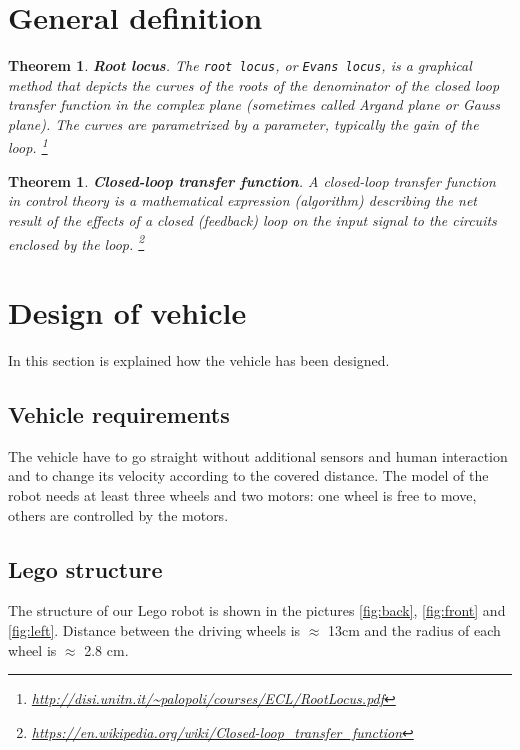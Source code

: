 \documentclass[a4paper,12pt,oneside]{article}
\newtheorem{thm}[equation]{Theorem}
\begin{document}
\section{General definition}
\begin{thm}
\textbf{Root locus}. The \texttt{root locus}, or \texttt{Evans locus}, is a graphical method that
depicts the curves of the roots of the denominator of the closed loop transfer function in the complex plane
(sometimes called Argand plane or Gauss plane). The curves are parametrized by a parameter, typically the
gain of the loop.  \footnote{\url{http://disi.unitn.it/~palopoli/courses/ECL/RootLocus.pdf}}
\end{thm}
\begin{thm}
\textbf{Closed-loop transfer function}. A closed-loop transfer function in control theory is a mathematical expression (algorithm) describing the net result of the effects of a closed (feedback) loop on the input signal to the circuits enclosed by the loop. \footnote{\url{https://en.wikipedia.org/wiki/Closed-loop_transfer_function}}
\end{thm}

\section{Design of vehicle}
In this section is explained how the vehicle has been designed.
\subsection{Vehicle requirements}
The vehicle have to go straight without additional sensors and human interaction and to change its velocity according to the covered distance. The model of the robot needs at least three wheels and two motors: one wheel is free to move, others are controlled by the motors.
\subsection{Lego structure}
The structure of our Lego robot is shown in the pictures \cref{fig:back}, \cref{fig:front} and \cref{fig:left}. Distance between the driving wheels is $\approx$ 13cm and the radius of each wheel is $\approx$ 2.8 cm. 
\end{document}
